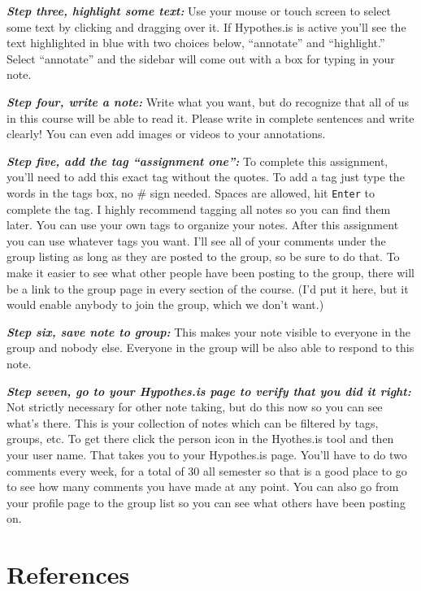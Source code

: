 \documentclass[12pt, openany]{book}
\begin{document}
\textbf{\emph{Step three, highlight some text:}} Use your mouse or touch screen to select some text by clicking and dragging over it. If Hypothes.is is active you'll see the text highlighted in blue with two choices below, ``annotate'' and ``highlight.'' Select ``annotate'' and the sidebar will come out with a box for typing in your note.

\textbf{\emph{Step four, write a note:}} Write what you want, but do recognize that all of us in this course will be able to read it. Please write in complete sentences and write clearly! You can even add images or videos to your annotations.

\textbf{\emph{Step five, add the tag ``assignment one'':}} To complete this assignment, you'll need to add this exact tag without the quotes. To add a tag just type the words in the tags box, no \# sign needed. Spaces are allowed, hit \texttt{Enter} to complete the tag. I highly recommend tagging all notes so you can find them later. You can use your own tags to organize your notes. After this assignment you can use whatever tags you want. I'll see all of your comments under the group listing as long as they are posted to the group, so be sure to do that. To make it easier to see what other people have been posting to the group, there will be a link to the group page in every section of the course. (I'd put it here, but it would enable anybody to join the group, which we don't want.)

\textbf{\emph{Step six, save note to group:}} This makes your note visible to everyone in the group and nobody else. Everyone in the group will be also able to respond to this note.

\textbf{\emph{Step seven, go to your Hypothes.is page to verify that you did it right:}} Not strictly necessary for other note taking, but do this now so you can see what's there. This is your collection of notes which can be filtered by tags, groups, etc. To get there click the person icon in the Hyothes.is tool and then your user name. That takes you to your Hypothes.is page. You'll have to do two comments every week, for a total of 30 all semester so that is a good place to go to see how many comments you have made at any point. You can also go from your profile page to the group list so you can see what others have been posting on.

\hypertarget{references}{%
\chapter*{References}\label{references}}
\end{document}
